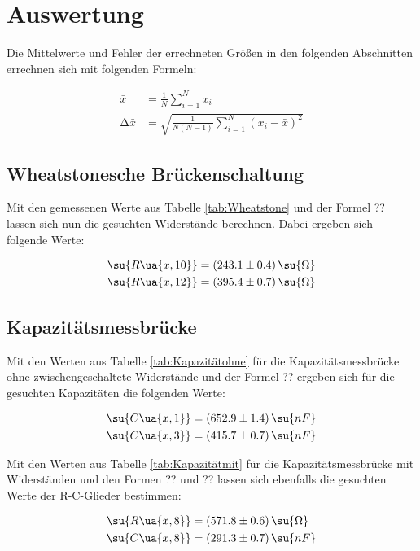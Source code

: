 \section{Auswertung}

Die Mittelwerte und Fehler der errechneten Größen in den folgenden Abschnitten
errechnen sich mit folgenden Formeln:

\begin{align}
  \label{eqn:barx}
  \bar{x}            &= \frac{1}{N} \sum_{i=1}^N x_i \\
  \increment \bar{x} &= \sqrt{ \frac{1}{N(N-1)} \sum_{i=1}^N \left(x_i - \bar{x}\right)^2}
  \label{eqn:incrementx}
\end{align}

\subsection{Wheatstonesche Brückenschaltung}
Mit den gemessenen Werte aus Tabelle \ref{tab:Wheatstone} und der Formel ??
lassen sich nun die gesuchten
Widerstände berechnen. Dabei ergeben sich folgende Werte:

\begin{align}
  \su{R\ua{x,10}} &= (243.1 \pm 0.4) \, \su{\Omega} \\
  \su{R\ua{x,12}} &= (395.4 \pm 0.7) \, \su{\Omega}
\end{align}

\subsection{Kapazitätsmessbrücke}

Mit den Werten aus Tabelle \ref{tab:Kapazitätohne} für die Kapazitätsmessbrücke
ohne zwischengeschaltete Widerstände und der Formel ?? ergeben sich für die
gesuchten Kapazitäten die folgenden Werte:

\begin{align}
  \su{C\ua{x,1}} &= (652.9 \pm 1.4) \, \su{nF} \\
  \su{C\ua{x,3}} &= (415.7 \pm 0.7) \, \su{nF}
\end{align}

Mit den Werten aus Tabelle \ref{tab:Kapazitätmit} für die Kapazitätsmessbrücke
mit Widerständen und den Formen ?? und ?? lassen sich ebenfalls die gesuchten
Werte der R-C-Glieder bestimmen:

\begin{align}
  \su{R\ua{x,8}} &= (571.8 \pm 0.6) \, \su{\Omega} \\
  \su{C\ua{x,8}} &= (291.3 \pm 0.7) \, \su{nF}
\end{align}

